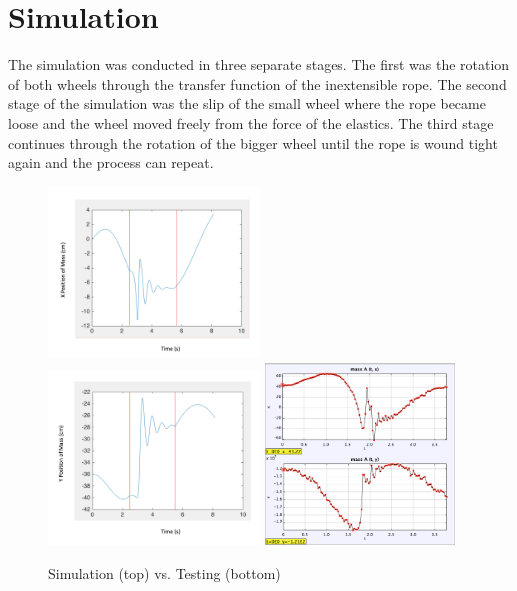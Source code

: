 \documentclass[twoside,twocolumn]{article}
\begin{document}

\section{Simulation}

The simulation was conducted in three separate stages. The first was the rotation of both wheels through the transfer function of the inextensible rope. The second stage of the simulation was the slip of the small wheel where the rope became loose and the wheel moved freely from the force of the elastics. The third stage continues through the rotation of the bigger wheel until the rope is wound tight again and the process can repeat.

\begin{figure}[!h]
    \caption{Simulation (top) vs. Testing (bottom)}
    \centering
        \includegraphics[width=0.5\textwidth]{x.png}
    \centering
        \includegraphics[width=0.5\textwidth]{y.png}
    \centering
        \includegraphics[width=0.45\textwidth]{tracking-plots.png}
\end{figure}
\end{document}
